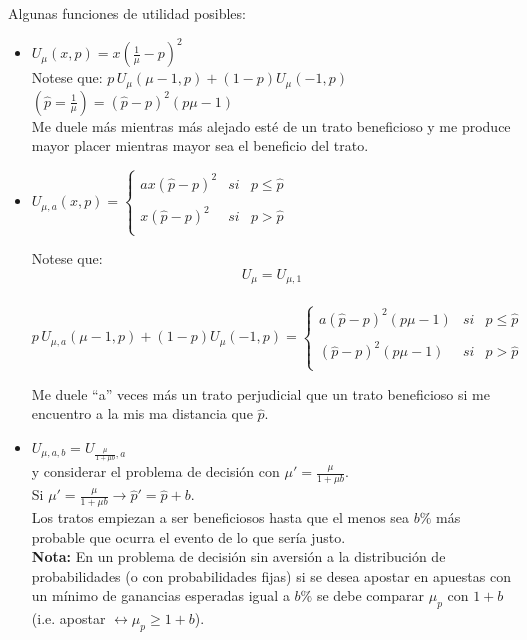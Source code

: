  Algunas funciones de utilidad posibles:
 \begin{itemize}
  \item $U_\mu(x,p)=x(\frac{1}{\mu}-p)^2$\\
 
  Notese que: $p\,U_\mu(\mu-1,p)+(1-p)U_\mu(-1,p)$\\
 
  $(\hat p=\frac{1}{\mu})=(\hat p-p)^2(p\mu-1)$\\
 
  Me duele más mientras más alejado esté de un trato beneficioso y me produce mayor placer mientras mayor sea el beneficio del trato.
 
  \item $U_{\mu,a}(x,p)= \left\{ \begin{array}{lcc}
              ax(\hat p-p)^2 &   si  & p \le \hat p \\
              & &\\
              x (\hat p-p)^2 &  si & p>\hat p\\             
              \end{array}
  \right.$
 
  Notese que: \\
  \[U_\mu=U_{\mu,1}\]\\
  \[p\,U_{\mu,a}(\mu-1,p)+(1-p)U_\mu(-1,p)= \left\{ \begin{array}{lcc}
              a(\hat p-p)^2 (p\mu-1)&   si  & p \le \hat p \\
              & &\\
              (\hat p-p)^2(p\mu-1) &  si & p>\hat p\\             
              \end{array}
  \right.\]

  Me duele ``a'' veces más un trato perjudicial  que un trato beneficioso si me encuentro a la mis ma distancia que $\hat p$.
 
  \item $U_{\mu,a,b}=U_{\frac{\mu}{1+\mu b},a}$\\
 
  y considerar el problema de decisión con $\mu'=\frac{\mu}{1+\mu b}$.\\
 
  Si $\mu'=\frac{\mu}{1+\mu b}\rightarrow \hat p'=\hat p+b$.\\
 
  Los tratos empiezan a ser beneficiosos hasta que el menos sea $b\%$ más probable que ocurra el evento de lo que sería justo.\\
 
  {\bf Nota:} En un problema de decisión sin aversión a la distribución de probabilidades (o con probabilidades fijas) si se desea apostar en apuestas con un mínimo de ganancias esperadas igual a $b\%$ se debe comparar $\mu_p$ con $1+b$ (i.e. apostar $\leftrightarrow \mu_p \ge 1+b$).
 
 \end{itemize}

